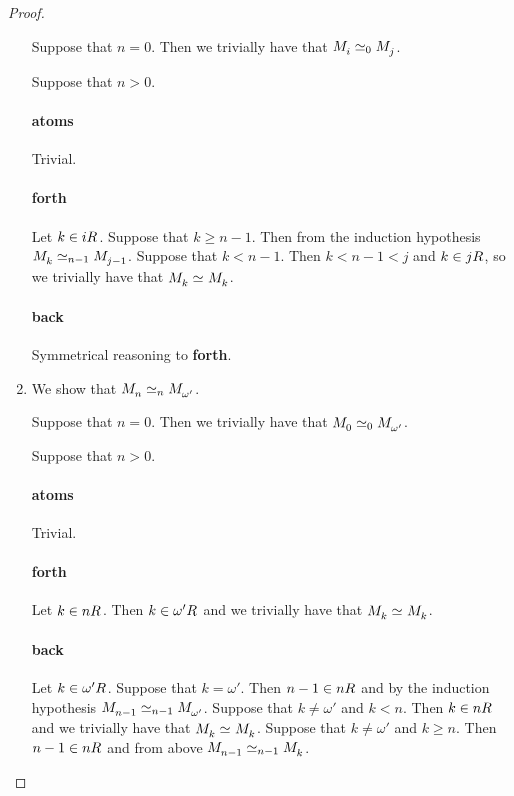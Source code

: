 \begin{proof}
\begin{enumerate}
        Suppose that $n = 0$. Then we trivially have that $\kPModel{i} \bisimilar[0] \kPModel{j}$.

        Suppose that $n > 0$.

        \paragraph{atoms} Trivial.

        \paragraph{forth} Let $k \in \kSuccessors{}{i}$.
        Suppose that $k \geq n - 1$. Then from the induction hypothesis $\kPModel{k} \bisimilar [n-1] \kPModel{j - 1}$.
        Suppose that $k < n - 1$. Then $k < n - 1 < j$ and $k \in \kSuccessors{}{j}$, so we trivially have that $\kPModel{k} \bisimilar \kPModel{k}$.

        \paragraph{back} Symmetrical reasoning to {\bf forth}.

    \item We show that $\kPModel{n} \bisimilar[n] \kPModel{\omega'}$.

        Suppose that $n = 0$. Then we trivially have that $\kPModel{0} \bisimilar[0] \kPModel{\omega'}$.

        Suppose that $n > 0$.

        \paragraph{atoms} Trivial.

        \paragraph{forth} Let $k \in \kSuccessors{}{n}$. Then $k \in \kSuccessors{}{\omega'}$ and we trivially have that $\kPModel{k} \bisimilar \kPModel{k}$.

        \paragraph{back} Let $k \in \kSuccessors{}{\omega'}$. 
        Suppose that $k = \omega'$. Then $n - 1 \in \kSuccessors{}{n}$ and by the induction hypothesis $\kPModel{n - 1} \bisimilar[n - 1] \kPModel{\omega'}$. 
        Suppose that $k \neq \omega'$ and $k < n$. Then $k \in \kSuccessors{}{n}$ and we trivially have that $\kPModel{k} \bisimilar \kPModel{k}$.
        Suppose that $k \neq \omega'$ and $k \geq n$. Then $n - 1 \in \kSuccessors{}{n}$ and from above $\kPModel{n - 1} \bisimilar[n - 1] \kPModel{k}$.


\end{enumerate}
\end{proof}
